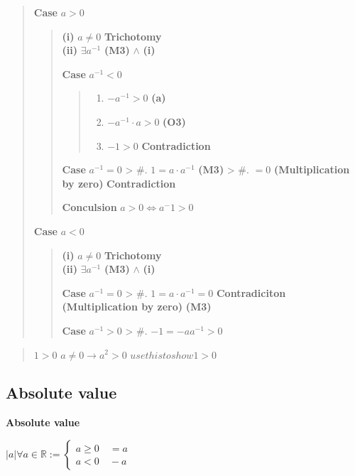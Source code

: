 \documentclass{tufte-book}
\providecommand{\tightlist}{%
  \setlength{\itemsep}{0pt}\setlength{\parskip}{0pt}}
\begin{document}
\begin{quote}
\textbf{Case} \(a > 0\)

\begin{quote}
\textbf{(i)} \(a \neq 0\) \textbf{Trichotomy}\\
\textbf{(ii)} \(\exists a^{-1}\) \textbf{(M3)} \(\wedge\) \textbf{(i)}

\textbf{Case} \(a^{-1} < 0\)

\begin{quote}
\begin{enumerate}
\tightlist
\item
  \(-a^{-1} > 0\) \textbf{(a)}
\item
  \(-a^{-1} \cdot a > 0\) \textbf{(O3)}
\item
  \(-1 > 0\) \textbf{Contradiction}
\end{enumerate}
\end{quote}

\textbf{Case} \(a^{-1} = 0\) \textgreater{} \#. \(1 = a \cdot a^{-1}\)
\textbf{(M3)} \textgreater{} \#. \(= 0\) \textbf{(Multiplication by
zero)} \textbf{Contradiction}

\textbf{Conculsion} \(a > 0 \Leftrightarrow a^-1 >0\)
\end{quote}

\textbf{Case} \(a < 0\)

\begin{quote}
\textbf{(i)} \(a \neq 0\) \textbf{Trichotomy}\\
\textbf{(ii)} \(\exists a^{-1}\) \textbf{(M3)} \(\wedge\) \textbf{(i)}

\textbf{Case} \(a^{-1} = 0\) \textgreater{} \#.
\(1 = a \cdot a^{-1} = 0\) \textbf{Contradiciton}
\textbf{(Multiplication by zero)} \textbf{(M3)}

\textbf{Case} \(a^{-1} > 0\) \textgreater{} \#. \(-1 = -a a^{-1} > 0\)
\end{quote}
\end{quote}

\begin{quote}
\(1 > 0\) \(a \neq 0 \to a^2 > 0\) \(use this to show 1 > 0\)
\end{quote}\hypertarget{absolute-value}{%
\subsection{Absolute value}\label{absolute-value}}

\textbf{Absolute value}

\(|a| \forall a \in \mathbb{R} := \begin{cases} a \geq 0 \quad = a \\ a < 0 \quad -a \end{cases}\)
\end{document}
